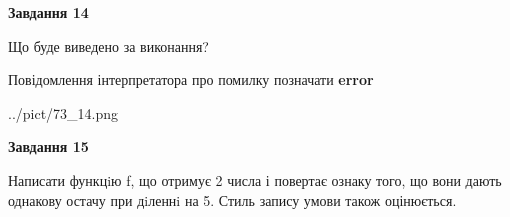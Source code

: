 \documentclass[11pt, ukrainian]{article}
\begin{document}
{\begin {large}
{\begin {center}\textbf{Завдання 14}\end {center}}\par
Що буде виведено за виконання? \par
Повідомлення інтерпретатора про помилку позначати \textbf{error}

\begin{center}
	{../pict/73_14.png}
\end{center}
\newpage

{\begin {center}\textbf{Завдання 15}\end {center}}\par

Написати функцiю f, що отримує 2 числа і повертає ознаку того, що вони дають однакову остачу при дiленнi на 5. Стиль запису умови також оцінюється.\par
\newpage

\end {large}}
\end{document}
